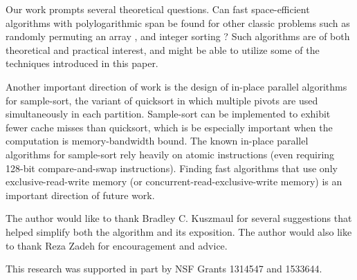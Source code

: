 \documentclass[sigconf]{acmart}
\renewcommand{\paragraph}[1]{\vspace{0.09in}\noindent{\bf \boldmath #1.}}
\theoremstyle{remark}
\theoremstyle{remark}
\begin{document}
Our work prompts several theoretical questions. Can fast
space-efficient algorithms with polylogarithmic span be found for
other classic problems such as randomly permuting an array
\cite{Anderson90, AlonsoSc96, ShunGu15}, and integer sorting
\cite{Rajasekaran92, HanHe12, AlbersHa97, Han01, GerbessiotisSi04}?
Such algorithms are of both theoretical and practical interest, and
might be able to utilize some of the techniques introduced in this
paper.

Another important direction of work is the design of in-place parallel
algorithms for sample-sort, the variant of quicksort in which multiple
pivots are used simultaneously in each partition. Sample-sort can be
implemented to exhibit fewer cache misses than quicksort, which is be
especially important when the computation is memory-bandwidth
bound. The known in-place parallel algorithms for sample-sort rely
heavily on atomic instructions \cite{AxtmannWi17} (even requiring
128-bit compare-and-swap instructions). Finding fast algorithms that
use only exclusive-read-write memory (or
concurrent-read-exclusive-write memory) is an important direction of
future work.


\paragraph{Acknowledgments} The author would like to thank Bradley C. Kuszmaul for several suggestions that helped simplify both the algorithm and its exposition. The author would also like to thank Reza Zadeh for encouragement and advice.

This research was supported in part by NSF Grants 1314547 and 1533644. 




\end{document}
